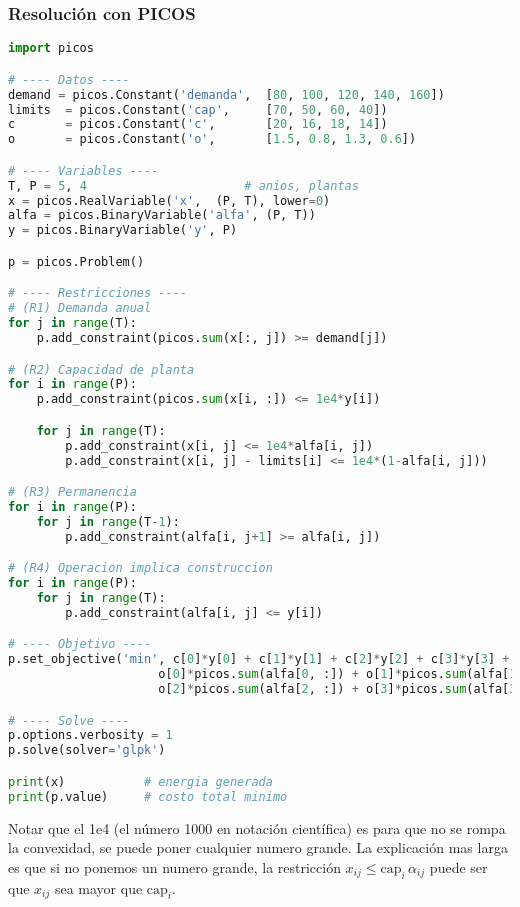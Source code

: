 \documentclass[12pt]{article}
\begin{document}
\subsubsection{Resolución con PICOS}
\begin{lstlisting}[language=Python]
import picos

# ---- Datos ----
demand = picos.Constant('demanda',  [80, 100, 120, 140, 160])
limits  = picos.Constant('cap',     [70, 50, 60, 40])
c       = picos.Constant('c',       [20, 16, 18, 14])
o       = picos.Constant('o',       [1.5, 0.8, 1.3, 0.6])

# ---- Variables ----
T, P = 5, 4                      # anios, plantas
x = picos.RealVariable('x',  (P, T), lower=0)
alfa = picos.BinaryVariable('alfa', (P, T))
y = picos.BinaryVariable('y', P)

p = picos.Problem()

# ---- Restricciones ----
# (R1) Demanda anual
for j in range(T):
    p.add_constraint(picos.sum(x[:, j]) >= demand[j])

# (R2) Capacidad de planta
for i in range(P):
    p.add_constraint(picos.sum(x[i, :]) <= 1e4*y[i])

    for j in range(T):
        p.add_constraint(x[i, j] <= 1e4*alfa[i, j])
        p.add_constraint(x[i, j] - limits[i] <= 1e4*(1-alfa[i, j]))

# (R3) Permanencia
for i in range(P):
    for j in range(T-1):
        p.add_constraint(alfa[i, j+1] >= alfa[i, j])

# (R4) Operacion implica construccion
for i in range(P):
    for j in range(T):
        p.add_constraint(alfa[i, j] <= y[i])

# ---- Objetivo ----
p.set_objective('min', c[0]*y[0] + c[1]*y[1] + c[2]*y[2] + c[3]*y[3] +
                     o[0]*picos.sum(alfa[0, :]) + o[1]*picos.sum(alfa[1, :]) +
                     o[2]*picos.sum(alfa[2, :]) + o[3]*picos.sum(alfa[3, :]))

# ---- Solve ----
p.options.verbosity = 1
p.solve(solver='glpk')

print(x)           # energia generada
print(p.value)     # costo total minimo
\end{lstlisting}

\vspace{0.5em}
Notar que el 1e4 (el número 1000 en notación científica) es para que no se rompa la convexidad, se puede poner cualquier numero grande. La explicación mas larga es que si no ponemos un numero grande, la restricción $x_{ij} \le \text{cap}_i\,\alpha_{ij}$ puede ser que $x_{ij}$ sea mayor que $\text{cap}_i$.
\end{document}
